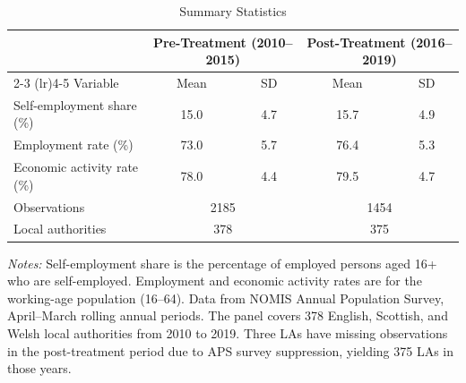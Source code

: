 
\begin{table}[htbp]
\centering
\caption{Summary Statistics}
\label{tab:summary}
\begin{tabular}{lcccc}
\toprule
& \multicolumn{2}{c}{Pre-Treatment (2010--2015)} & \multicolumn{2}{c}{Post-Treatment (2016--2019)} \\
\cmidrule(lr){2-3} \cmidrule(lr){4-5}
Variable & Mean & SD & Mean & SD \\
\midrule
Self-employment share (\%) & 15.0 & 4.7 & 15.7 & 4.9 \\
Employment rate (\%) & 73.0 & 5.7 & 76.4 & 5.3 \\
Economic activity rate (\%) & 78.0 & 4.4 & 79.5 & 4.7 \\
\midrule
Observations & \multicolumn{2}{c}{2185} & \multicolumn{2}{c}{1454} \\
Local authorities & \multicolumn{2}{c}{378} & \multicolumn{2}{c}{375} \\
\bottomrule
\end{tabular}
\begin{tablenotes}
\small
\item \textit{Notes:} Self-employment share is the percentage of employed persons aged 16+ who are self-employed. Employment and economic activity rates are for the working-age population (16--64). Data from NOMIS Annual Population Survey, April--March rolling annual periods. The panel covers 378 English, Scottish, and Welsh local authorities from 2010 to 2019. Three LAs have missing observations in the post-treatment period due to APS survey suppression, yielding 375 LAs in those years.
\end{tablenotes}
\end{table}

